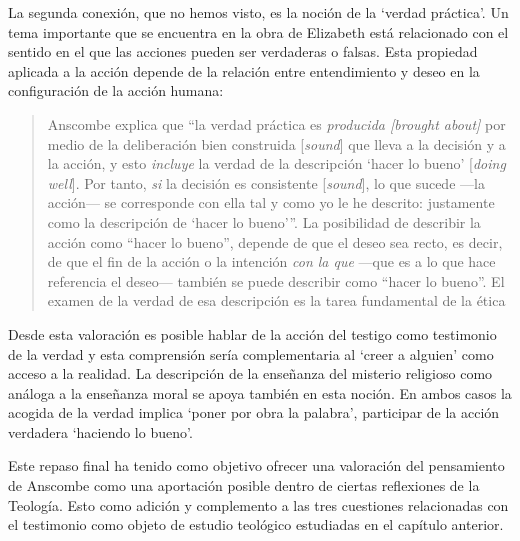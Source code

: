 La segunda conexión, que no hemos visto, es la noción de la `verdad práctica'. Un tema importante que se encuentra en la obra de Elizabeth está relacionado con el sentido en el que las acciones pueden ser verdaderas o falsas. Esta propiedad aplicada a la acción depende de la relación entre entendimiento y deseo en la configuración de la acción humana: \blockquote[{\Cite[189]{torralba2005accion}}]{Anscombe explica que ``la verdad práctica es \emph{producida [brought about]} por medio de la deliberación bien construida [\emph{sound}] que lleva a la decisión y a la acción, y esto \emph{incluye} la verdad de la descripción `hacer lo bueno' [\emph{doing well}]. Por tanto, \emph{si} la decisión es consistente [\emph{sound}], lo que sucede ---la acción--- se corresponde con ella tal y como yo le he descrito: justamente como la descripción de `hacer lo bueno'''. La posibilidad de describir la acción como ``hacer lo bueno'', depende de que el deseo sea recto, es decir, de que el fin de la acción o la intención \emph{con la que} ---que es a lo que hace referencia el deseo--- también se puede describir como ``hacer lo bueno''. El examen de la verdad de esa descripción es la tarea fundamental de la ética}. Desde esta valoración es posible hablar de la acción del testigo como testimonio de la verdad y esta comprensión sería complementaria al `creer a alguien' como acceso a la realidad. La descripción de la enseñanza del misterio religioso como análoga a la enseñanza moral se apoya también en esta noción. En ambos casos la acogida de la verdad implica `poner por obra la palabra', participar de la acción verdadera `haciendo lo bueno'.

Este repaso final ha tenido como objetivo ofrecer una valoración del pensamiento de Anscombe como una aportación posible dentro de ciertas reflexiones de la Teología. Esto como adición y complemento a las tres cuestiones relacionadas con el testimonio como objeto de estudio teológico estudiadas en el capítulo anterior.

